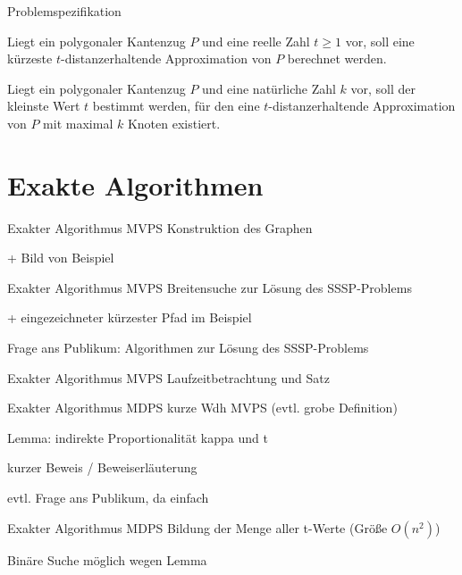 \documentclass{beamer}
\begin{document}
	\begin{frame}{Problemspezifikation}
		\begin{definition}
			Liegt ein polygonaler Kantenzug $P$ und eine reelle Zahl $t \geq 1$ vor, soll eine kürzeste $t$-distanzerhaltende Approximation von $P$ berechnet werden.
		\end{definition}
		\begin{definition}
			Liegt ein polygonaler Kantenzug $P$ und eine natürliche Zahl $k$ vor, soll der kleinste Wert $t$ bestimmt werden, für den eine $t$-distanzerhaltende Approximation von $P$ mit maximal $k$ Knoten existiert.
		\end{definition}
		

	\end{frame}
	
	\section{Exakte Algorithmen}
	\begin{frame}{Exakter Algorithmus MVPS}
		Konstruktion des Graphen
		
		+ Bild von Beispiel
		
	\end{frame}
	
	\begin{frame}{Exakter Algorithmus MVPS}
		Breitensuche zur Lösung des SSSP-Problems
		
		+ eingezeichneter kürzester Pfad im Beispiel
		
		Frage ans Publikum: Algorithmen zur Lösung des SSSP-Problems
	\end{frame}
	
	\begin{frame}{Exakter Algorithmus MVPS}
		Laufzeitbetrachtung und Satz
	\end{frame}
	
	\begin{frame}{Exakter Algorithmus MDPS}
		kurze Wdh MVPS (evtl. grobe Definition)
		
		Lemma: indirekte Proportionalität kappa und t
		
		kurzer Beweis / Beweiserläuterung
		
		evtl. Frage ans Publikum, da einfach
	\end{frame}
	
	\begin{frame}{Exakter Algorithmus MDPS}
		Bildung der Menge aller t-Werte (Größe $O(n^2)$)
		
		Binäre Suche möglich wegen Lemma
		
	\end{frame}
	
\end{document}
